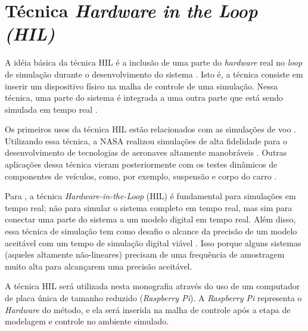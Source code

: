 \section{Técnica \textit{Hardware in the Loop (HIL)}}

A idéia básica da técnica HIL é a inclusão de 
uma parte do \textit{hardware} real no \textit{loop} de simulação durante o desenvolvimento 
do sistema \cite{Bacic}. Isto é, a técnica consiste em inserir um dispositivo físico 
na malha de controle de uma simulação. Nessa técnica, uma parte do sistema é integrada 
a uma outra parte que está sendo simulada em tempo real \cite{Abourida}.

Os primeiros usos da técnica HIL estão relacionados com 
as simulações de voo \cite{Isermann}. Utilizando essa técnica, a NASA realizou simulações de alta 
fidelidade para o desenvolvimento de tecnologias de aeronaves altamente manobráveis \cite{Evans}. 
Outras aplicações dessa técnica vieram posteriormente com os testes dinâmicos de componentes 
de veículos, como, por exemplo, suspensão e corpo do carro \cite{Isermann}.

Para , a técnica \textit{Hardware-in-the-Loop} (HIL) é fundamental
para simulações em tempo real; não para simular o sistema completo em tempo real, mas sim
para conectar uma parte do sistema a um modelo digital em tempo real. Além disso, essa técnica
de simulação tem como desafio o alcance da precisão de um modelo aceitável com um tempo de simulação 
digital viável \cite{Abourida}. Isso porque alguns sistemas (aqueles altamente não-lineares)
precisam de uma frequência de amostragem muito alta para alcançarem uma precisão aceitável.

A técnica HIL será utilizada nesta monografia através do uso de um computador de placa única
de tamanho reduzido (\textit{Raspberry Pi}). A \textit{Raspberry Pi} representa o \textit{Hardware} 
do método, e ela será inserida na malha de controle após a etapa de modelagem e controle no 
ambiente simulado.

\clearpage